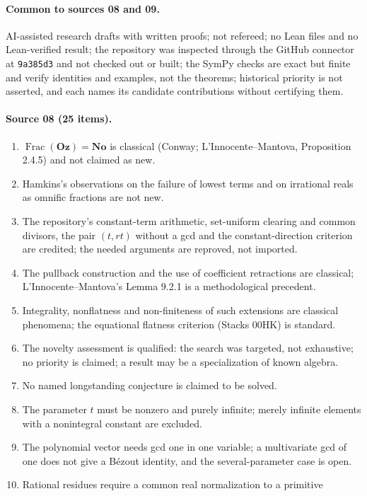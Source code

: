 \documentclass[11pt,oneside]{article}
\numberwithin{equation}{section}
\theoremstyle{definition}
\theoremstyle{remark}
\newcommand{\No}{\mathbf{No}}
\newcommand{\Oz}{\mathbf{Oz}}
\newcommand{\Frac}{\operatorname{Frac}}
\begin{document}
\paragraph{Common to sources 08 and 09.} AI-assisted research drafts with
written proofs; not refereed; no Lean files and no Lean-verified result; the
repository was inspected through the GitHub connector at \texttt{9a385d3} and
not checked out or built; the SymPy checks are exact but finite and verify
identities and examples, not the theorems; historical priority is not
asserted, and each names its candidate contributions without certifying them.

\paragraph{Source 08 (25 items).}
\begin{enumerate}[leftmargin=*,itemsep=1pt]
\item $\Frac(\Oz)=\No$ is classical (Conway; L'Innocente--Mantova, Proposition
2.4.5) and not claimed as new.
\item Hamkins's observations on the failure of lowest terms and on irrational
reals as omnific fractions are not new.
\item The repository's constant-term arithmetic, set-uniform clearing and
common divisors, the pair $(t,rt)$ without a gcd and the constant-direction
criterion are credited; the needed arguments are reproved, not imported.
\item The pullback construction and the use of coefficient retractions are
classical; L'Innocente--Mantova's Lemma 9.2.1 is a methodological precedent.
\item Integrality, nonflatness and non-finiteness of such extensions are
classical phenomena; the equational flatness criterion (Stacks 00HK) is
standard.
\item The novelty assessment is qualified: the search was targeted, not
exhaustive; no priority is claimed; a result may be a specialization of known
algebra.
\item No named longstanding conjecture is claimed to be solved.
\item The parameter $t$ must be nonzero and purely infinite; merely infinite
elements with a nonintegral constant are excluded.
\item The polynomial vector needs gcd one in one variable; a multivariate gcd of
one does not give a B\'ezout identity, and the several-parameter case is open.
\item Rational residues require a common real normalization to a primitive

\end{enumerate}
\end{document}
